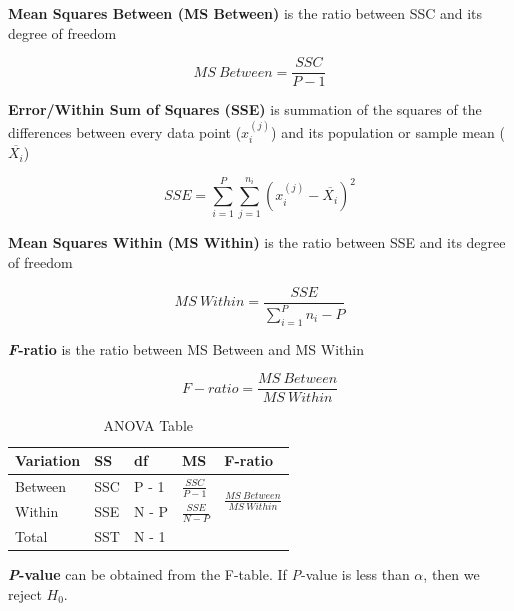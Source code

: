 \documentclass{article}
\begin{document}
\textbf{Mean Squares Between (MS Between)} is the ratio between SSC and its degree of freedom

\begin{equation}
    MS\ Between = \frac{SSC}{P - 1}
\end{equation}

\textbf{Error/Within Sum of Squares (SSE)} is summation of the squares of the differences between every data point ($x_{i}^{(j)}$) and its population or sample mean ($\overline{X_i}$)

\begin{equation}
    SSE = \sum_{i=1}^{P}\sum_{j=1}^{n_i} (x_{i}^{(j)} - \overline{X_i})^2
\end{equation}

\textbf{Mean Squares Within (MS Within)} is the ratio between SSE and its degree of freedom

\begin{equation}
    MS\ Within = \frac{SSE}{\sum_{i=1}^{P}n_i - P}
\end{equation}

\textbf{\textit{F}-ratio} is the ratio between MS Between and MS Within

\begin{equation}
    F-ratio = \frac{MS\ Between}{MS\ Within}
\end{equation}

\begin{table}[h]
\centering
\begin{tabular}{|l|l|l|ll}
\hline
\textbf{Variation} & \textbf{SS} & \textbf{df} & \multicolumn{1}{l|}{\textbf{MS}} & \multicolumn{1}{l|}{\textbf{F-ratio}}                       \\ \hline
Between            & SSC         & P - 1       & \multicolumn{1}{l|}{$\frac{SSC}{P - 1}$} & \multicolumn{1}{l|}{\multirow{2}{*}{$\frac{MS\ Between}{MS\ Within}$}} \\ \cline{1-4}
Within             & SSE         & N - P       & \multicolumn{1}{l|}{$\frac{SSE}{N - P}$}  & \multicolumn{1}{l|}{}                                       \\ \hline
Total              & SST         & N - 1       &                                  &                                                             \\ \cline{1-3}
\end{tabular}
\caption{ANOVA Table}
\label{tab:anova}
\end{table}

\textbf{\textit{P}-value} can be obtained from the F-table. If \textit{P}-value is less than $\alpha$, then we reject $H_0$.
\end{document}
